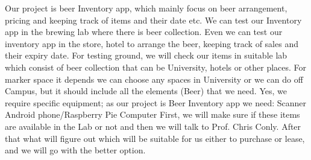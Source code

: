 Our project is beer Inventory app, which mainly focus on beer arrangement, pricing and keeping track of items and their date etc.  We can test our Inventory app in the brewing lab where there is beer collection. Even we can test our inventory app in the store, hotel to arrange the beer, keeping track of sales and their expiry date. For testing ground, we will check our items in suitable lab which consist of beer collection that can be University, hotels or other places. For marker space it depends we can choose any spaces in University or we can do off Campus, but it should include all the elements (Beer) that we need. Yes, we require specific equipment; as our project is Beer Inventory app we need:
 Scanner
Android phone/Raspberry Pie
 Computer 
First, we will make sure if these items are available in the Lab or not and then we will talk to Prof. Chris Conly. After that what will figure out which will be suitable for us either to purchase or lease, and  we will go with the better option.
